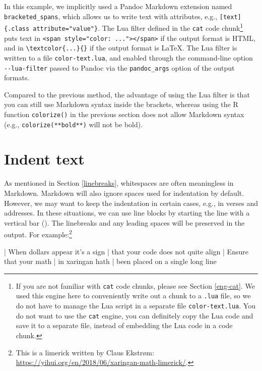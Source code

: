 \documentclass[
  11pt,
]{krantz}
\newenvironment{Shaded}{\begin{snugshade}}{\end{snugshade}}
\newcommand{\NormalTok}[1]{#1}
\begin{document}
In this example, we implicitly used a Pandoc Markdown extension named \texttt{bracketed\_spans}, which allows us to write text with attributes, e.g., \texttt{{[}text{]}\{.class\ attribute="value"\}}. The Lua filter defined in the \texttt{cat} code chunk\footnote{If you are not familiar with \texttt{cat} code chunks, please see Section \ref{eng-cat}. We used this engine here to conveniently write out a chunk to a \texttt{.lua} file, so we do not have to manage the Lua script in a separate file \texttt{color-text.lua}. You do not want to use the \texttt{cat} engine, you can definitely copy the Lua code and save it to a separate file, instead of embedding the Lua code in a code chunk.} puts text in \texttt{\textless{}span\ style="color:\ ..."\textgreater{}\textless{}/span\textgreater{}} if the output format is HTML, and in \texttt{\textbackslash{}textcolor\{...\}\{\}} if the output format is LaTeX. The Lua filter is written to a file \texttt{color-text.lua}, and enabled through the command-line option \texttt{-\/-lua-filter} passed to Pandoc via the \texttt{pandoc\_args} option of the output formats.

Compared to the previous method, the advantage of using the Lua filter is that you can still use Markdown syntax inside the brackets, whereas using the R function \texttt{colorize()} in the previous section does not allow Markdown syntax (e.g., \texttt{colorize(\textquotesingle{}**bold**\textquotesingle{})} will not be bold).

\hypertarget{indent-text}{%
\section{Indent text}\label{indent-text}}

As mentioned in Section \ref{linebreaks}, whitespaces are often meaningless in Markdown. Markdown will also ignore spaces used for indentation by default. However, we may want to keep the indentation in certain cases, e.g., in verses and addresses. In these situations, we can use line blocks by starting the line with a vertical bar (\texttt{\textbar{}}). The linebreaks and any leading spaces will be preserved in the output. For example:\footnote{This is a limerick written by Claus Ekstrøm: \url{https://yihui.org/en/2018/06/xaringan-math-limerick/}.}

\begin{Shaded}
\begin{Highlighting}[]
\NormalTok{| When dollars appear it's a sign}
\NormalTok{|   that your code does not quite align  }
\NormalTok{| Ensure that your math  }
\NormalTok{|   in xaringan hath  }
\NormalTok{|   been placed on a single long line}
\end{Highlighting}
\end{Shaded}
\end{document}
